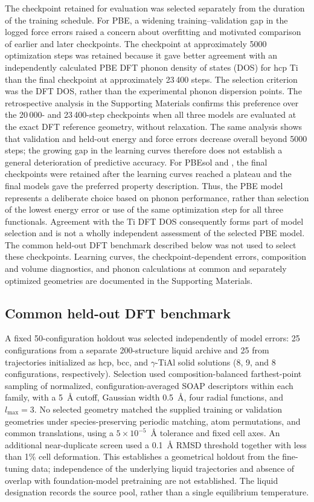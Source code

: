 The checkpoint retained for evaluation was selected separately from the duration of the training schedule.
For PBE, a widening training--validation gap in the logged force errors raised a concern about overfitting and motivated comparison of earlier and later checkpoints.
The checkpoint at approximately 5000 optimization steps was retained because it gave better agreement with an independently calculated PBE DFT phonon density of states (DOS) for hcp Ti than the final checkpoint at approximately 23\,400 steps.
The selection criterion was the DFT DOS, rather than the experimental phonon dispersion points.
The retrospective analysis in the Supporting Materials confirms this preference over the 20\,000- and 23\,400-step checkpoints when all three models are evaluated at the exact DFT reference geometry, without relaxation.
The same analysis shows that validation and held-out energy and force errors decrease overall beyond 5000 steps; the growing gap in the learning curves therefore does not establish a general deterioration of predictive accuracy.
For PBEsol and \rscan{}, the final checkpoints were retained after the learning curves reached a plateau and the final models gave the preferred property description.
Thus, the PBE model represents a deliberate choice based on phonon performance, rather than selection of the lowest energy error or use of the same optimization step for all three functionals.
Agreement with the Ti DFT DOS consequently forms part of model selection and is not a wholly independent assessment of the selected PBE model.
The common held-out DFT benchmark described below was not used to select these checkpoints.
Learning curves, the checkpoint-dependent errors, composition and volume diagnostics, and phonon calculations at common and separately optimized geometries are documented in the Supporting Materials.

\subsection{Common held-out DFT benchmark}
\label{sec:testset}

A fixed 50-configuration holdout was selected independently of model errors: 25 configurations from a separate 200-structure liquid archive and 25 from trajectories initialized as hcp, bcc, and $\gamma$-TiAl solid solutions (8, 9, and 8 configurations, respectively).
Selection used composition-balanced farthest-point sampling of normalized, configuration-averaged SOAP descriptors within each family, with a 5~\AA{} cutoff, Gaussian width 0.5~\AA, four radial functions, and $l_{\max}=3$.
No selected geometry matched the supplied training or validation geometries under species-preserving periodic matching, atom permutations, and common translations, using a $5\times10^{-5}$~\AA{} tolerance and fixed cell axes.
An additional near-duplicate screen used a 0.1~\AA{} RMSD threshold together with less than 1\% cell deformation.
This establishes a geometrical holdout from the fine-tuning data; independence of the underlying liquid trajectories and absence of overlap with foundation-model pretraining are not established.
The liquid designation records the source pool, rather than a single equilibrium temperature.

